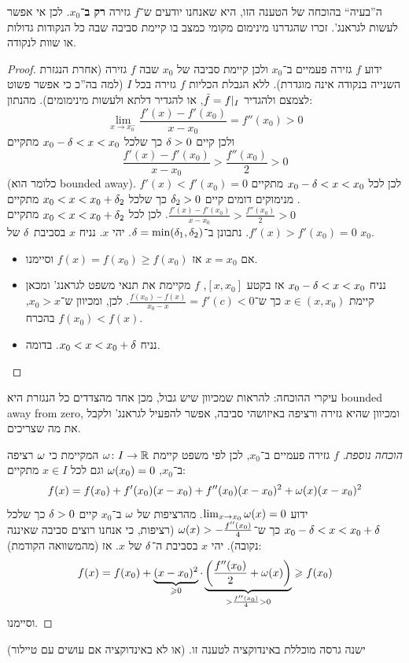 \documentclass[name=רשימות חשבון דיפרנציאלי ואינטגרלי 1א]{../../../tex/classes/megasumPreamble}
\begin{document}
	ה''בעיה`` בהוכחה של הטענה הזו, היא שאנחנו יודעים ש־$f$ גזירה \textbf{רק ב־$x_0$}. לכן אי אפשר לעשות לגראנג'. זכרו שהגדרנו מינימום מקומי כמצב בו קיימת סביבה שבה כל הנקודות גדולות או שוות לנקודה. \begin{proof}
		ידוע $f$ גזירה פעמיים ב־$x_0$ ולכן קיימת סביבה של $x_0$ שבה $f$ גזירה (אחרת הנגזרת השנייה בנקודה אינה מוגדרת). ללא הגבלת הכליות $f$ גזירה בכל $I$ (למה בה''כ כי אפשר פשוט לצמצם ולהגדיר $\tilde f = f|_I$, או להגדיר דלתא ולעשות מינימומים). מהנתון:
		\[ \lim_{x \to x_0^{-}} \frac{f'(x) - f'(x_0)}{x - x_0} = f''(x_0) > 0 \]
		ולכן קיים $\delta > 0$ כך שלכל $x_0 - \delta  < x < x_0$ מתקיים
		\[ \frac{f'(x) - f'(x_0)}{x - x_0} > \frac{f''(x_0)}{2} > 0 \]
		(כלומר הוא bounded away). לכן לכל $x_0 - \delta < x < x_0$ מתקיים $f'(x) < f'(x_0) = 0$. מנימוקים דומים קיים $\delta_2> 0$ כך שלכל $x_0 < x < x_0 + \delta_2$ מתקיים $\frac{f'(x) - f'(x_0)}{x - x_0} > \frac{f''(x_0)}{2} > 0$.
		לכן לכל $x_0 < x < x_0 + \delta_2$  מתקיים $f'(x) > f'(x_0) = 0$. נתבונן ב־$\delta = \min(\delta_1, \delta_2)$. יהי $x$. נניח $x$ בסביבת $\delta$ של $x_0$.
		\begin{itemize}
			\item אם $x = x_0$ אז $f(x) = f(x_0) \ge f(x_0)$ וסיימנו.
			\item נניח $x_0 - \delta < x < x_0$ אז בקטע $[x, x_0]$, $f$ מקיימת את תנאי משפט לגראנג' ומכאן קיימת $x \in (x, x_0)$ כך ש־$\frac{f(x_0) - f(x)}{x_0 - x} = f'(c) < 0$. לכן, ומכיוון ש־$x_0 > x$, בהכרח $f(x_0) < f(x)$.
			\item נניח $x_0 < x < x_0 + \delta$. בדומה.
		\end{itemize}
	\end{proof}
	עיקרי ההוכחה: להראות שמכיוון שיש גבול, מכן אחד מהצדדים כל הנגזרת היא bounded away from zero, ומכיוון שהיא גזירה ורציפה באיזושהי סביבה, אפשר להפעיל לגראנג' ולקבל את מה שצריכים.


	\begin{proof}[הוכחה נוספת]
		$f$ גזירה פעמיים ב־$x_0$, לכן לפי משפט קיימת $\omega \colon I \to \mathbb{R}$ המקיימת כי $\omega$ רציפה ב־$x_0$, $\omega(x_0) = 0$ וגם לכל $x \in I$ מתקיים:
		\[ f(x) = f(x_0) + f'(x_0)(x - x_0) + f''(x_0)(x - x_0)^{2} + \omega(x)(x - x_0)^{2} \]
		ידוע $\lim_{x \to x_0} \omega(x) = 0$. מהרציפות של $\omega$ ב־$x_0$ קיים $\delta > 0$ כך שלכל $x_0 - \delta < x < x_0 + \delta$ כך ש־$\omega(x) > -\frac{f''(x_0)}{4}$ (רציפות, כי אנחנו רוצים סביבה שאיננה נקובה). יהי $x$ בסביבת ה־$\delta$ של $x$. אז (מהמשוואה הקודמת):
		\[ f(x) = f(x_0) + \underbrace{(x - x_0)^{2}}_{\geqslant 0} \cdot \underbrace{\left ( \frac{f''(x_0)}{2} + \omega(x) \right )}_{> \frac{f''(x_0)}{4} >  0} \geqslant f(x_0) \]
		וסיימנו.
	\end{proof}
	ישנה גרסה מוכללת באינדוקציה לטענה זו. (או לא באינדוקציה אם עושים עם טיילור)
\end{document}
